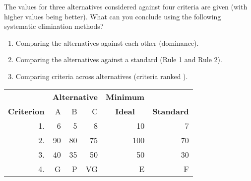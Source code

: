 \begin{exercises}
    \begin{exercise}
    \label{sea-7-19}
        The values for three alternatives considered against four criteria are given (with higher values being better). What can you conclude using the following systematic elimination methods?
        \begin{enumerate}[label=\alph*)]
            \item Comparing the alternatives against each other (dominance).
            \item Comparing the alternatives against a standard (Rule 1 and Rule 2).
            \item Comparing criteria across alternatives (criteria ranked  ).
        \end{enumerate}
        \begin{table}[h]
        \centering
        \begin{tabular}{r r r r r r}
        \toprule
         & \multicolumn{3}{c}{\textbf{Alternative}} & \multicolumn{1}{c}{\textbf{Minimum}} \\
        \cmidrule{2-4}
        \multicolumn{1}{c}{\textbf{Criterion}} & A & B & C & \multicolumn{1}{c}{\textbf{Ideal}} & \multicolumn{1}{c}{\textbf{Standard}} \\
        \midrule
        1. & 6  & 5  & 8  & 10  & 7  \\
        2. & 90 & 80 & 75 & 100 & 70 \\
        3. & 40 & 35 & 50 & 50  & 30 \\
        4. & G  & P  & VG & E   & F  \\
        \bottomrule
        \end{tabular}
        \label{tab:sea-7-19} %
        \end{table}
    \end{exercise}
    \begin{solution}
    \end{solution}
    

\end{exercises}
